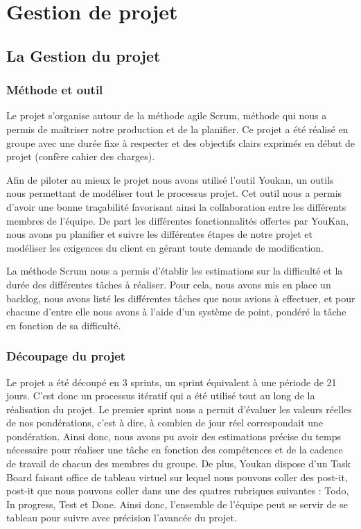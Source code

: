 \chapter{Gestion de projet}
\minitoc

\section{La Gestion du projet}

\subsection{Méthode et outil}

Le projet s'organise autour de la méthode agile Scrum, méthode qui nous a permis de maîtriser notre production et de la planifier. Ce projet a été réalisé en groupe avec une durée fixe à respecter et des objectifs clairs exprimés en début de projet (confère cahier des charges).

Afin de piloter au mieux le projet nous avons utilisé l'outil Youkan, un outils nous permettant de modéliser tout le processus projet. Cet outil nous a permis d'avoir une bonne traçabilité favorisant ainsi la collaboration entre les différents membres de l'équipe.
De part les différentes fonctionnalités offertes par YouKan, nous avons pu planifier et suivre les différentes étapes de notre projet et modéliser les exigences du client en gérant toute demande de modification.

La méthode Scrum nous a permis d'établir les estimations sur la difficulté et la durée des différentes tâches à réaliser. Pour cela, nous avons mis en place un backlog, nous avons listé les différentes tâches que nous avions à effectuer, et pour chacune d'entre elle nous avons à l'aide d'un système de point, pondéré la tâche en fonction de sa difficulté. 

\subsection{Découpage du projet}

Le projet a été découpé en 3 sprints, un sprint équivalent à une période de 21 jours. C'est donc un processus itératif qui a été utilisé tout au long de la réalisation du projet. Le premier sprint nous a permit d'évaluer les valeurs réelles de nos pondérations, c'est à dire, à combien de jour réel correspondait une pondération. Ainsi donc, nous avons pu avoir des estimations précise du temps nécessaire pour réaliser une tâche en fonction des compétences et de la cadence de travail de chacun des membres du groupe. 
De plus, Youkan dispose d'un Task Board faisant office de tableau virtuel sur lequel nous pouvons coller des post-it, post-it que nous pouvons coller dans une des quatres rubriques suivantes : Todo, In progress, Test et Done. Ainsi donc, l'ensemble de l'équipe peut se servir de se tableau pour suivre avec précision l'avancée du projet.

